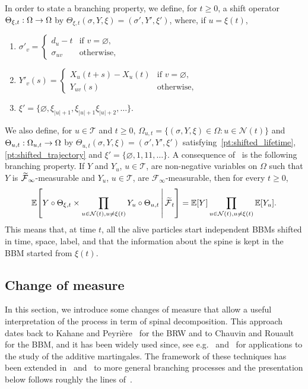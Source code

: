 \documentclass[10pt]{amsart}
\theoremstyle{definition}\newtheorem{defi}[theo]{Definition}\newtheorem{rema}[theo]{Remark}\newtheorem{exam}[theo]{Example}\newtheorem{exem}[theo]{Example}\newtheorem{nota}[theo]{Notation}
\newcommand{\E}{\mathbb{E}}
\newcommand\1{\mathds{1}}
\newcommand{\cF}{\mathcal{F}}
\newcommand{\cN}{\mathcal{N}}
\newcommand{\cT}{\mathcal{T}}
\newcommand*{\relabel}{\renewcommand{\labelenumi}{(\theenumi)}}
\newcommand*{\romanenumi}{\renewcommand*{\theenumi}{\roman{enumi}}\relabel}
\let\oldtilde\tilde
\renewcommand*{\tilde}[1]{\mathchoice{\widetilde{#1}}{\widetilde{#1}}{\oldtilde{#1}}{\oldtilde{#1}}}
\let\originalleft\left
\let\originalright\right
\renewcommand{\left}{\mathopen{}\mathclose\bgroup\originalleft}
\renewcommand{\right}{\aftergroup\egroup\originalright}
\renewcommand*{\to}{\mathchoice{\longrightarrow}{\rightarrow}{\rightarrow}{\rightarrow}}
\begin{document}
In order to state a branching property, we define, for $t \geq 0$, a shift operator $\Theta_{\xi, t} : \Omega \to \Omega$ by $\Theta_{\xi, t}(\sigma, Y, \xi) = (\sigma', Y', \xi')$, where, if $u = \xi(t)$,
\begin{enumerate}\romanenumi
\item\label{pt:shifted_lifetime}
$\sigma'_v =
\begin{cases}
d_u - t & \text{if } v = \varnothing, \\
\sigma_{uv} & \text{otherwise},
\end{cases}$
\item\label{pt:shifted_trajectory}
$Y'_v(s) =
\begin{cases}
X_u(t + s) - X_u(t) & \text{if } v = \varnothing, \\
Y_{uv}(s) & \text{otherwise},
\end{cases}$
\item $\xi' = \{\varnothing, \xi_{|u| + 1}, \xi_{|u| + 1}\xi_{|u| + 2}, \dots \}$.
\end{enumerate}
We also define, for $u \in \cT$ and $t \geq 0$, $\Omega_{u, t} = \{(\sigma, Y, \xi) \in \Omega : u \in \cN(t)\}$ and $\Theta_{u, t} : \Omega_{u, t} \to \Omega$ by $\Theta_{u, t}(\sigma, Y, \xi) = (\sigma', Y', \xi')$ satisfying~\eqref{pt:shifted_lifetime}, \eqref{pt:shifted_trajectory} and $\xi' = \{\varnothing, 1, 11, \dots \}$. A consequence of~\cite[Proposition~2.1]{Chauvin1991} is the following branching property. If $Y$ and $Y_u$, $u \in \cT$, are non-negative variables on $\Omega$ such that $Y$ is $\tilde{\cF}_\infty$-measurable and $Y_u$, $u \in \cT$, are $\cF_\infty$-measurable, then for every $t \geq 0$,
\begin{equation}\label{eq:branching_property_with_spine}
\E \left[Y \circ \Theta_{\xi, t} \times \prod_{u \in \cN(t), u \neq \xi(t)} Y_u \circ \Theta_{u, t} \,\middle|\, \tilde{\cF}_t \right] = \E[Y] \prod_{u \in \cN(t), u \neq \xi(t)} \E[Y_u]. 
\end{equation}
This means that, at time $t$, all the alive particles start independent BBMs shifted in time, space, label, and that the information about the spine is kept in the BBM started from $\xi(t)$.

\subsection{Change of measure}\label{subsec:change_of_measure}

In this section, we introduce some changes of measure that allow a useful interpretation of the process in term of spinal decomposition. This approach dates back to Kahane and Peyrière~\cite{KahanePeyriere1976} for the BRW and to Chauvin and Rouault~\cite{ChauvinRouault1988} for the BBM, and it has been widely used since, see e.g.~\cite{Lyons1997} and~\cite{Kyprianou2004} for applications to the study of the additive martingales. The framework of these techniques has been extended in~\cite{HardyHarris2006} and~\cite{HarrisRoberts2017} to more general branching processes and the presentation below follows roughly the lines of~\cite{HardyHarris2006}.
\end{document}
